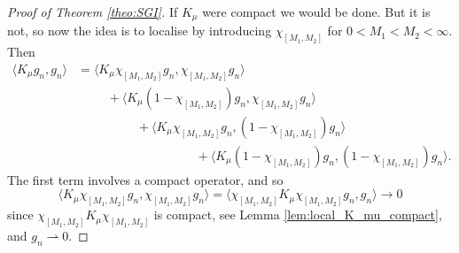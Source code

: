 \documentclass[reqno,11pt,letterpaper]{amsart}
\numberwithin{equation}{section}
\begin{document}
\begin{proof}[Proof of Theorem \ref{theo:SGI}]
  If $K_\mu$ were compact we would be done. But it is not, so now the idea is to localise by introducing $\chi_{[M_1,M_2]}$ for $0<M_1<M_2<\infty$. Then 
  \begin{equation} \label{eq:SG_Theo_PRoof1}
      \begin{split}
          \langle K_\mu g_n, g_n\rangle & = \big\langle  K_\mu \chi_{[M_1,M_2]} g_n, \chi_{[M_1,M_2]} g_n \big\rangle 
          \\
          & \hspace{1cm}
          +  \big\langle  K_\mu (1-\chi_{[M_1,M_2]}) g_n, \chi_{[M_1,M_2]}g_n \big\rangle  
           \\ & \hspace{2cm}
          +\big\langle  K_\mu \chi_{[M_1,M_2]} g_n, (1-\chi_{[M_1,M_2]}) g_n \big\rangle 
          \\
          & \hspace{4cm} + 
          \big\langle K_\mu (1-\chi_{[M_1,M_2]}) g_n, (1-\chi_{[M_1,M_2]}) g_n\big\rangle.
      \end{split}
  \end{equation}
  The first term involves a compact operator, and so 
  $$\big\langle  K_\mu \chi_{[M_1,M_2]} g_n, \chi_{[M_1,M_2]} g_n \big\rangle = \langle \chi_{[M_1,M_2]} K_\mu \chi_{[M_1,M_2]} g_n,  g_n\rangle \to 0$$ since $\chi_{[M_1,M_2]} K_\mu \chi_{[M_1,M_2]}$ is compact, see Lemma \ref{lem:local_K_mu_compact}, and $g_n \rightharpoonup 0$.


\end{proof}
\end{document}

